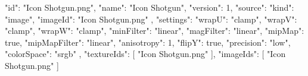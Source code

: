 {
  "id": "Icon Shotgun.png",
  "name": "Icon Shotgun",
  "version": 1,
  "source": {
    "kind": "image",
    "imageId": "Icon Shotgun.png"
  },
  "settings": {
    "wrapU": "clamp",
    "wrapV": "clamp",
    "wrapW": "clamp",
    "minFilter": "linear",
    "magFilter": "linear",
    "mipMap": true,
    "mipMapFilter": "linear",
    "anisotropy": 1,
    "flipY": true,
    "precision": "low",
    "colorSpace": "srgb"
  },
  "textureIds": [
    "Icon Shotgun.png"
  ],
  "imageIds": [
    "Icon Shotgun.png"
  ]
}
